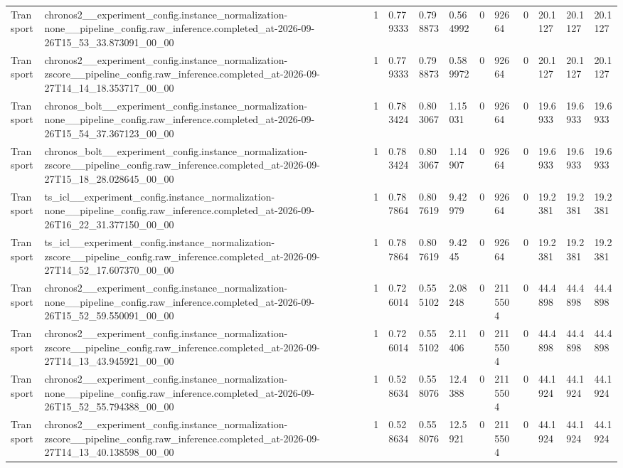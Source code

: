 \begin{tabular}{llllllllllll}
Transport & chronos2\_\_experiment\_config.instance\_normalization-none\_\_pipeline\_config.raw\_inference.completed\_at-2026-09-26T15\_53\_33.873091\_00\_00 & 1 & 0.779333 & 0.798873 & 0.564992 & 0 & 92664 & 0 & 20.1127 & 20.1127 & 20.1127 \\
Transport & chronos2\_\_experiment\_config.instance\_normalization-zscore\_\_pipeline\_config.raw\_inference.completed\_at-2026-09-27T14\_14\_18.353717\_00\_00 & 1 & 0.779333 & 0.798873 & 0.589972 & 0 & 92664 & 0 & 20.1127 & 20.1127 & 20.1127 \\
Transport & chronos\_bolt\_\_experiment\_config.instance\_normalization-none\_\_pipeline\_config.raw\_inference.completed\_at-2026-09-26T15\_54\_37.367123\_00\_00 & 1 & 0.783424 & 0.803067 & 1.15031 & 0 & 92664 & 0 & 19.6933 & 19.6933 & 19.6933 \\
Transport & chronos\_bolt\_\_experiment\_config.instance\_normalization-zscore\_\_pipeline\_config.raw\_inference.completed\_at-2026-09-27T15\_18\_28.028645\_00\_00 & 1 & 0.783424 & 0.803067 & 1.14907 & 0 & 92664 & 0 & 19.6933 & 19.6933 & 19.6933 \\
Transport & ts\_icl\_\_experiment\_config.instance\_normalization-none\_\_pipeline\_config.raw\_inference.completed\_at-2026-09-26T16\_22\_31.377150\_00\_00 & 1 & 0.787864 & 0.807619 & 9.42979 & 0 & 92664 & 0 & 19.2381 & 19.2381 & 19.2381 \\
Transport & ts\_icl\_\_experiment\_config.instance\_normalization-zscore\_\_pipeline\_config.raw\_inference.completed\_at-2026-09-27T14\_52\_17.607370\_00\_00 & 1 & 0.787864 & 0.807619 & 9.4245 & 0 & 92664 & 0 & 19.2381 & 19.2381 & 19.2381 \\
Transport & chronos2\_\_experiment\_config.instance\_normalization-none\_\_pipeline\_config.raw\_inference.completed\_at-2026-09-26T15\_52\_59.550091\_00\_00 & 1 & 0.726014 & 0.555102 & 2.08248 & 0 & 2115504 & 0 & 44.4898 & 44.4898 & 44.4898 \\
Transport & chronos2\_\_experiment\_config.instance\_normalization-zscore\_\_pipeline\_config.raw\_inference.completed\_at-2026-09-27T14\_13\_43.945921\_00\_00 & 1 & 0.726014 & 0.555102 & 2.11406 & 0 & 2115504 & 0 & 44.4898 & 44.4898 & 44.4898 \\
Transport & chronos2\_\_experiment\_config.instance\_normalization-none\_\_pipeline\_config.raw\_inference.completed\_at-2026-09-26T15\_52\_55.794388\_00\_00 & 1 & 0.528634 & 0.558076 & 12.4388 & 0 & 2115504 & 0 & 44.1924 & 44.1924 & 44.1924 \\
Transport & chronos2\_\_experiment\_config.instance\_normalization-zscore\_\_pipeline\_config.raw\_inference.completed\_at-2026-09-27T14\_13\_40.138598\_00\_00 & 1 & 0.528634 & 0.558076 & 12.5921 & 0 & 2115504 & 0 & 44.1924 & 44.1924 & 44.1924 \\

\end{tabular}
